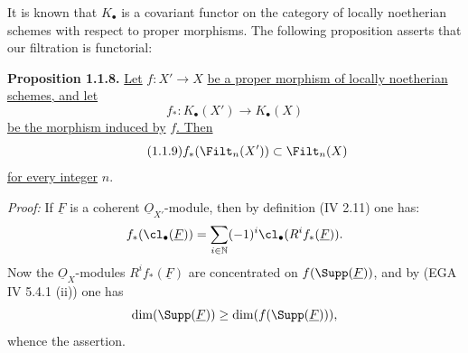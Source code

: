 It is known that $K_\bullet$ is a covariant functor on the category of locally noetherian schemes with respect to proper morphisms. The following proposition asserts that our filtration is functorial:

\textbf{Proposition 1.1.8.} \uline{Let} $f:X'\to X$ \uline{be a proper morphism of locally noetherian schemes, and let}
\[
f_*:K_\bullet(X')\longrightarrow K_\bullet(X)
\]
\uline{be the morphism induced by} $f$\uline{. Then}
\begin{equation}\tag{1.1.9}
f_*(\Filt_n(X'))\subset\Filt_n(X)
\end{equation}
\uline{for every integer} $n$.

\emph{Proof:} If $\underline{F}$ is a coherent $\underline{O}_{X'}$-module, then by definition (IV 2.11) one has:
\[
f_*(\cl_\bullet(\underline{F}))=\sum_{i\in\mathbb N}(-1)^i\cl_\bullet(R^if_*(\underline{F})).
\]
Now the $\underline{O}_X$-modules $R^if_*(\underline{F})$ are concentrated on $f(\Supp(\underline{F}))$, and by (EGA IV 5.4.1 (ii)) one has
\[
\dim(\Supp(\underline{F}))\geq\dim(f(\Supp(\underline{F}))),
\]
whence the assertion.


%

